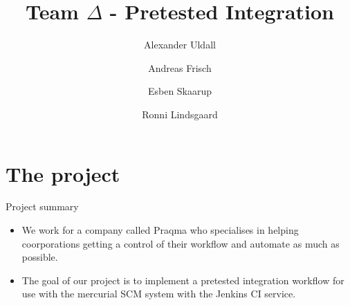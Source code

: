 \documentclass[8pt]{beamer}
\title{Team $\Delta$ - Pretested Integration}
\author{Alexander Uldall \and Andreas Frisch \and Esben Skaarup \and Ronni Lindsgaard}
\begin{document}
	\maketitle
	\section{The project}
		\begin{frame}{Project summary}
			\begin{itemize}
				\item We work for a company called Praqma who specialises in helping
				coorporations getting a control of their workflow and automate as much
				as possible.
				\item The goal of our project is to implement a pretested
				integration workflow for use with the mercurial SCM system with
				the Jenkins CI service.
			\end{itemize}
		\end{frame}
	
\end{document}

